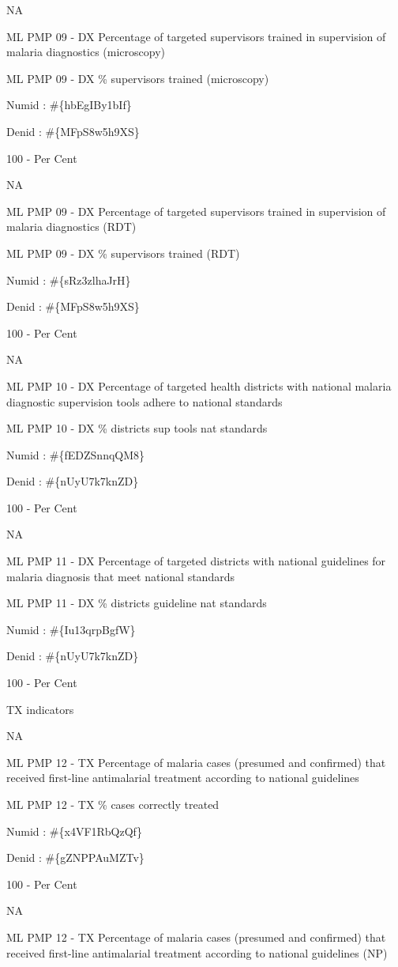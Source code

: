 \documentclass[]{book}
\begin{document}
NA

ML PMP 09 - DX Percentage of targeted supervisors trained in supervision of malaria diagnostics (microscopy)

ML PMP 09 - DX \% supervisors trained (microscopy)

Numid : \#\{hbEgIBy1bIf\}

Denid : \#\{MFpS8w5h9XS\}

100 - Per Cent

NA

ML PMP 09 - DX Percentage of targeted supervisors trained in supervision of malaria diagnostics (RDT)

ML PMP 09 - DX \% supervisors trained (RDT)

Numid : \#\{sRz3zlhaJrH\}

Denid : \#\{MFpS8w5h9XS\}

100 - Per Cent

NA

ML PMP 10 - DX Percentage of targeted health districts with national malaria diagnostic supervision tools adhere to national standards

ML PMP 10 - DX \% districts sup tools nat standards

Numid : \#\{fEDZSnnqQM8\}

Denid : \#\{nUyU7k7knZD\}

100 - Per Cent

NA

ML PMP 11 - DX Percentage of targeted districts with national guidelines for malaria diagnosis that meet national standards

ML PMP 11 - DX \% districts guideline nat standards

Numid : \#\{Iu13qrpBgfW\}

Denid : \#\{nUyU7k7knZD\}

100 - Per Cent

TX indicators

NA

ML PMP 12 - TX Percentage of malaria cases (presumed and confirmed) that received first-line antimalarial treatment according to national guidelines

ML PMP 12 - TX \% cases correctly treated

Numid : \#\{x4VF1RbQzQf\}

Denid : \#\{gZNPPAuMZTv\}

100 - Per Cent

NA

ML PMP 12 - TX Percentage of malaria cases (presumed and confirmed) that received first-line antimalarial treatment according to national guidelines (NP)
\end{document}
